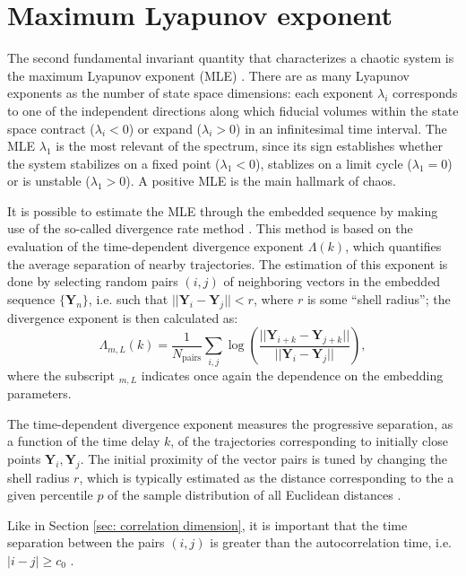 \section{Maximum Lyapunov exponent}
\label{sec: mle}

The second fundamental invariant quantity that characterizes a chaotic system is the maximum Lyapunov
exponent (MLE) \cite{ref:abarbanel_fourier_spectra}.
There are as many Lyapunov exponents as the number of state space dimensions: each exponent $\lambda_i$
corresponds to one of the independent directions along which fiducial volumes within the state space
contract ($\lambda_i<0$) or expand ($\lambda_i>0$) in an infinitesimal time interval.
The MLE $\lambda_1$ is the most relevant of the spectrum, since its sign establishes whether the system
stabilizes on a fixed point ($\lambda_1<0$), stablizes on a limit cycle ($\lambda_1=0$) or is unstable
($\lambda_1>0$). A positive MLE is the main hallmark of chaos.

It is possible to estimate the MLE through the embedded sequence by making use of the so-called
divergence rate method \cite{ref:gao1993local}. This method
is based on the evaluation of the time-dependent divergence exponent $\Lambda(k)$,
which quantifies the average separation of nearby trajectories.
The estimation of this exponent is done by selecting random pairs $(i,j)$ of neighboring vectors
in the embedded sequence $\{\mathbf{Y}_n\}$, i.e. such that $||\mathbf{Y}_i-\mathbf{Y}_j||<r$,
where $r$ is some ``shell radius''; the divergence exponent is then calculated as:
\begin{equation}
    \label{eq: divergence exponent}
    \Lambda_{m,L}(k)=\frac{1}{N_{\text{pairs}}}\sum_{i,j}\log\left(
        \frac{||\mathbf{Y}_{i+k}-\mathbf{Y}_{j+k}||}{||\mathbf{Y}_i-\mathbf{Y}_j||}
    \right),
\end{equation}
where the subscript $_{m,L}$ indicates once again the dependence on the embedding parameters.

The time-dependent divergence exponent
measures the progressive separation, as a function of the time delay $k$, of the trajectories corresponding
to initially close points $\mathbf{Y}_i,\mathbf{Y}_j$.
The initial proximity of the vector pairs is tuned by changing the shell
radius $r$, which is typically estimated as the distance corresponding to the a given percentile $p$ of the
sample distribution of all Euclidean distances 
\cite{ref:franchi2014statistical,ref:ricci2020asymptotic}.

Like in Section \ref{sec: correlation dimension}, it is important that the time separation between
the pairs $(i,j)$ is greater than the autocorrelation time, i.e. $|i-j|\geq c_0$ 
\cite{ref:theiler1986spurious,ref:albano1995kolmogorov}.

